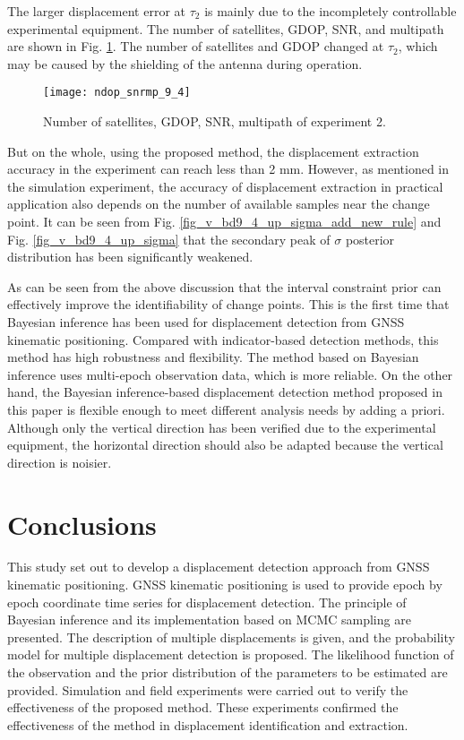 \documentclass[final,3p,times]{elsarticle}
\begin{document}
	The larger displacement error at $\tau_2$ is mainly due to the incompletely controllable experimental equipment. 
	\textcolor{r_s}{
		 The number of satellites, GDOP, SNR, and multipath are shown in Fig. \ref{fig_v_ndop_snrmp_9_4}. The number of satellites and GDOP changed at $\tau_2$, which may be caused by the shielding of the antenna during operation.}	
	\begin{figure}[htbp]
		\centering
		\texttt{[image: ndop\_snrmp\_9\_4]}
		\caption{Number of satellites, GDOP, SNR, multipath of experiment 2.}
		\label{fig_v_ndop_snrmp_9_4}
	\end{figure} 
	But on the whole, using the proposed method, the displacement extraction accuracy in the experiment can reach less than 2 mm. However, as mentioned in the simulation experiment, the accuracy of displacement extraction in practical application also depends on the number of available samples near the change point.
	It can be seen from Fig. \ref{fig_v_bd9_4_up_sigma_add_new_rule} and Fig. \ref{fig_v_bd9_4_up_sigma} that the secondary peak of $\sigma$ posterior distribution has been significantly weakened.
	
	As can be seen from the above discussion that the interval constraint prior can effectively improve the identifiability of change points.
	\textcolor{r_s}{
		This is the first time that Bayesian inference has been used for displacement detection from GNSS kinematic positioning.
		Compared with indicator-based detection methods, this method has high robustness and flexibility.
		The method based on Bayesian inference uses multi-epoch observation data, which is more reliable.
		On the other hand, the Bayesian inference-based displacement detection method proposed in this paper is flexible enough to meet different analysis needs by adding a priori. Although only the vertical direction has been verified due to the experimental equipment, the horizontal direction should also be adapted because the vertical direction is noisier.
	}
	
	\section{Conclusions}
	\label{concl}
	This study set out to develop a \textcolor{r_s}{displacement detection approach} from GNSS kinematic positioning. 
	\textcolor{r_s}{GNSS kinematic positioning is used to provide epoch by epoch coordinate time series for displacement detection.}
	The principle of Bayesian inference and its implementation based on MCMC sampling are presented.
	The description of multiple displacements is given, and the \textcolor{r_s}{probability} model for multiple displacement detection is proposed.
	The likelihood function of the observation and the prior distribution of the parameters to be estimated are provided.
	Simulation and field experiments were carried out to verify the effectiveness of the proposed method. 
	These experiments confirmed the effectiveness of the method in displacement identification and extraction.
	
\end{document}
